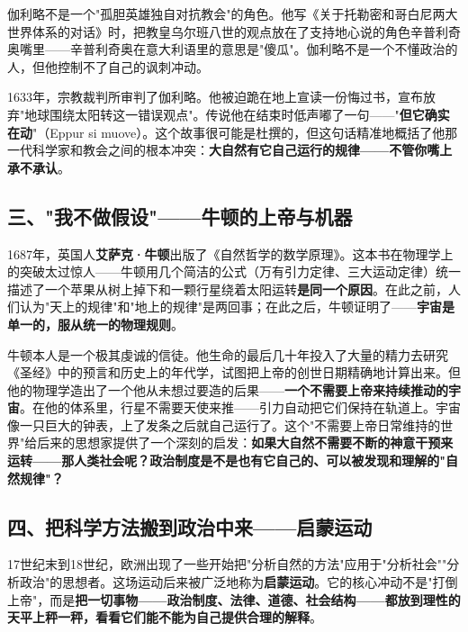 \documentclass[a4paper,12pt]{ctexart}
\begin{document}
伽利略不是一个"孤胆英雄独自对抗教会"的角色。他写《关于托勒密和哥白尼两大世界体系的对话》时，把教皇乌尔班八世的观点放在了支持地心说的角色辛普利奇奥嘴里——辛普利奇奥在意大利语里的意思是"傻瓜"。伽利略不是一个不懂政治的人，但他控制不了自己的讽刺冲动。

1633年，宗教裁判所审判了伽利略。他被迫跪在地上宣读一份悔过书，宣布放弃"地球围绕太阳转这一错误观点"。传说他在结束时低声嘟了一句——"\textbf{但它确实在动}"（Eppur si muove）。这个故事很可能是杜撰的，但这句话精准地概括了他那一代科学家和教会之间的根本冲突：\textbf{大自然有它自己运行的规律——不管你嘴上承不承认}。

\subsection*{三、"我不做假设"——牛顿的上帝与机器}

1687年，英国人\textbf{艾萨克·牛顿}出版了《自然哲学的数学原理》。这本书在物理学上的突破太过惊人——牛顿用几个简洁的公式（万有引力定律、三大运动定律）统一描述了一个苹果从树上掉下和一颗行星绕着太阳运转\textbf{是同一个原因}。在此之前，人们认为"天上的规律"和"地上的规律"是两回事；在此之后，牛顿证明了——\textbf{宇宙是单一的，服从统一的物理规则}。

牛顿本人是一个极其虔诚的信徒。他生命的最后几十年投入了大量的精力去研究《圣经》中的预言和历史上的年代学，试图把上帝的创世日期精确地计算出来。但他的物理学造出了一个他从未想过要造的后果——\textbf{一个不需要上帝来持续推动的宇宙}。在他的体系里，行星不需要天使来推——引力自动把它们保持在轨道上。宇宙像一只巨大的钟表，上了发条之后就自己运行了。这个"不需要上帝日常维持的世界"给后来的思想家提供了一个深刻的启发：\textbf{如果大自然不需要不断的神意干预来运转——那人类社会呢？政治制度是不是也有它自己的、可以被发现和理解的"自然规律"？}

\subsection*{四、把科学方法搬到政治中来——启蒙运动}

17世纪末到18世纪，欧洲出现了一些开始把"分析自然的方法"应用于"分析社会""分析政治"的思想者。这场运动后来被广泛地称为\textbf{启蒙运动}。它的核心冲动不是"打倒上帝"，而是\textbf{把一切事物——政治制度、法律、道德、社会结构——都放到理性的天平上秤一秤，看看它们能不能为自己提供合理的解释}。
\end{document}
